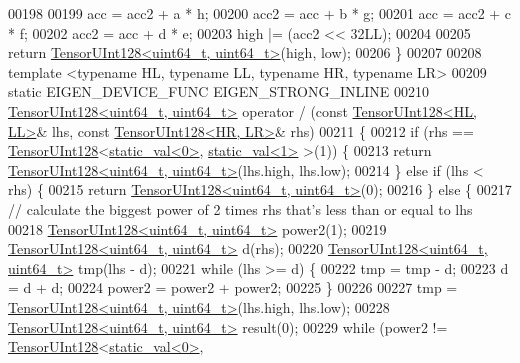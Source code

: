 \begin{DoxyCode}
00198 
00199   acc = acc2 + a * h;
00200   acc2 = acc + b * g;
00201   acc = acc2 + c * f;
00202   acc2 = acc + d * e;
00203   high |= (acc2 << 32LL);
00204 
00205   \textcolor{keywordflow}{return} \hyperlink{struct_eigen_1_1internal_1_1_tensor_u_int128}{TensorUInt128<uint64\_t, uint64\_t>}(high, low);
00206 \}
00207 
00208 \textcolor{keyword}{template} <\textcolor{keyword}{typename} HL, \textcolor{keyword}{typename} LL, \textcolor{keyword}{typename} HR, \textcolor{keyword}{typename} LR>
00209 \textcolor{keyword}{static} EIGEN\_DEVICE\_FUNC EIGEN\_STRONG\_INLINE
00210 \hyperlink{struct_eigen_1_1internal_1_1_tensor_u_int128}{TensorUInt128<uint64\_t, uint64\_t>} operator / (\textcolor{keyword}{const} 
      \hyperlink{struct_eigen_1_1internal_1_1_tensor_u_int128}{TensorUInt128<HL, LL>}& lhs, \textcolor{keyword}{const} \hyperlink{struct_eigen_1_1internal_1_1_tensor_u_int128}{TensorUInt128<HR, LR>}& rhs)
00211 \{
00212   \textcolor{keywordflow}{if} (rhs == \hyperlink{struct_eigen_1_1internal_1_1_tensor_u_int128}{TensorUInt128}<\hyperlink{struct_eigen_1_1internal_1_1static__val}{static\_val<0>}, 
      \hyperlink{struct_eigen_1_1internal_1_1static__val}{static\_val<1>} >(1)) \{
00213     \textcolor{keywordflow}{return} \hyperlink{struct_eigen_1_1internal_1_1_tensor_u_int128}{TensorUInt128<uint64\_t, uint64\_t>}(lhs.high, lhs.low);
00214   \} \textcolor{keywordflow}{else} \textcolor{keywordflow}{if} (lhs < rhs) \{
00215     \textcolor{keywordflow}{return} \hyperlink{struct_eigen_1_1internal_1_1_tensor_u_int128}{TensorUInt128<uint64\_t, uint64\_t>}(0);
00216   \} \textcolor{keywordflow}{else} \{
00217     \textcolor{comment}{// calculate the biggest power of 2 times rhs that's less than or equal to lhs}
00218     \hyperlink{struct_eigen_1_1internal_1_1_tensor_u_int128}{TensorUInt128<uint64\_t, uint64\_t>} power2(1);
00219     \hyperlink{struct_eigen_1_1internal_1_1_tensor_u_int128}{TensorUInt128<uint64\_t, uint64\_t>} d(rhs);
00220     \hyperlink{struct_eigen_1_1internal_1_1_tensor_u_int128}{TensorUInt128<uint64\_t, uint64\_t>} tmp(lhs - d);
00221     \textcolor{keywordflow}{while} (lhs >= d) \{
00222       tmp = tmp - d;
00223       d = d + d;
00224       power2 = power2 + power2;
00225     \}
00226 
00227     tmp = \hyperlink{struct_eigen_1_1internal_1_1_tensor_u_int128}{TensorUInt128<uint64\_t, uint64\_t>}(lhs.high, lhs.low);
00228     \hyperlink{struct_eigen_1_1internal_1_1_tensor_u_int128}{TensorUInt128<uint64\_t, uint64\_t>} result(0);
00229     \textcolor{keywordflow}{while} (power2 != \hyperlink{struct_eigen_1_1internal_1_1_tensor_u_int128}{TensorUInt128}<\hyperlink{struct_eigen_1_1internal_1_1static__val}{static\_val<0>}, 

\end{DoxyCode}

